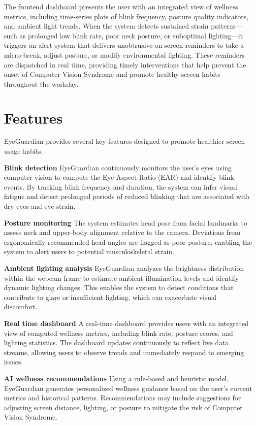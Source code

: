 \documentclass[12pt]{report}
\begin{document}
The frontend dashboard presents the user with an integrated view of wellness metrics, including time‑series plots of blink frequency, posture quality indicators, and ambient light trends. When the system detects sustained strain patterns—such as prolonged low blink rate, poor neck posture, or suboptimal lighting—it triggers an alert system that delivers unobtrusive on‑screen reminders to take a micro‑break, adjust posture, or modify environmental lighting. These reminders are dispatched in real time, providing timely interventions that help prevent the onset of Computer Vision Syndrome and promote healthy screen habits throughout the workday.

\section{Features}

EyeGuardian provides several key features designed to promote healthier screen usage habits.

\textbf{Blink detection}
EyeGuardian continuously monitors the user’s eyes using computer vision to compute the Eye Aspect Ratio (EAR) and identify blink events. By tracking blink frequency and duration, the system can infer visual fatigue and detect prolonged periods of reduced blinking that are associated with dry eyes and eye strain.

\textbf{Posture monitoring}
The system estimates head pose from facial landmarks to assess neck and upper‑body alignment relative to the camera. Deviations from ergonomically recommended head angles are flagged as poor posture, enabling the system to alert users to potential musculoskeletal strain.

\textbf{Ambient lighting analysis}
EyeGuardian analyzes the brightness distribution within the webcam frame to estimate ambient illumination levels and identify dynamic lighting changes. This enables the system to detect conditions that contribute to glare or insufficient lighting, which can exacerbate visual discomfort.

\textbf{Real time dashboard}
A real‑time dashboard provides users with an integrated view of computed wellness metrics, including blink rate, posture scores, and lighting statistics. The dashboard updates continuously to reflect live data streams, allowing users to observe trends and immediately respond to emerging issues.

\textbf{AI wellness recommendations}
Using a rule‑based and heuristic model, EyeGuardian generates personalized wellness guidance based on the user’s current metrics and historical patterns. Recommendations may include suggestions for adjusting screen distance, lighting, or posture to mitigate the risk of Computer Vision Syndrome.
\end{document}
